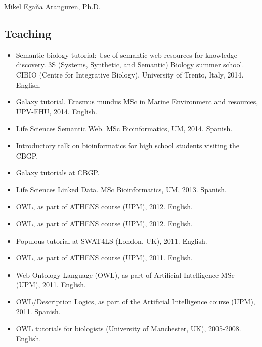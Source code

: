 \documentclass[english,11pt,a4paper,oneside]{article}
\begin{document}
\begin{cv}{Mikel Ega\~na Aranguren, Ph.D. }
\subsection*{Teaching}

\begin{itemize}








\item Semantic biology tutorial: Use of semantic web resources for knowledge discovery. 3S (Systems, Synthetic, and Semantic) Biology summer school. CIBIO (Centre for Integrative Biology), University of Trento, Italy, 2014. English.
\item Galaxy tutorial. Erasmus mundus MSc in Marine Environment and resources, UPV-EHU, 2014. English.
\item Life Sciences Semantic Web. MSc Bioinformatics, UM, 2014. Spanish. %
\item Introductory talk on bioinformatics for high school students visiting the CBGP.
\item Galaxy tutorials at CBGP. %

\item Life Sciences Linked Data. MSc Bioinformatics, UM, 2013. Spanish.
\item OWL, as part of ATHENS course (UPM), 2012. English.
\item OWL, as part of ATHENS course (UPM), 2012. English.
	
\item Populous tutorial at SWAT4LS (London, UK), 2011. English.
\item OWL, as part of ATHENS course (UPM), 2011. English.
\item Web Ontology Language (OWL), as part of Artificial Intelligence MSc (UPM), 2011. English. %
\item OWL/Description Logics, as part of the Artificial Intelligence course (UPM), 2011. Spanish. %
\item OWL tutorials for biologists (University of Manchester, UK), 2005-2008. English.


\end{itemize}
\end{cv}
\end{document}
